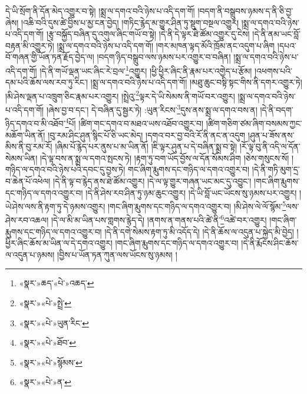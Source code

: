 དེ་ཡི་སྲོག་ནི་དོན་མེད་འགྱུར་བ་སྟེ། །སྨྲ་ལ་དགའ་བའི་ཉེས་པ་འདི་དག་གོ། །བདག་ནི་བསྒྲུབས་ཉམས་ད་ནི་ཅི་བྱ་ཞེས། །འཆི་བའི་དུས་ཚེ་བྱིས་པ་མྱ་ངན་བྱེད། །གཏིང་རྙེད་མ་གྱུར་ཤིན་ཏུ་སྡུག་བསྔལ་འགྱུར། །སྨྲ་ལ་དགའ་བའི་ཉེས་པ་འདི་དག་གོ། །རྩྭ་བསྐྱོད་བཞིན་དུ་འགུལ་ཞིང་གཡོ་བ་སྟེ། །དེ་ནི་དེ་ལྟར་ཐེ་ཚོམ་འགྱུར་དུ་ངེས། །དེ་ནི་ནམ་ཡང་བློ་བརྟན་མི་འགྱུར་ཏེ། །སྨྲ་ལ་དགའ་བའི་ཉེས་པ་འདི་དག་གོ། །གར་མཁན་ལྟད་མོའི་ཁྲོམ་ནང་འདུག་པ་ཞིག །དཔའ་བོ་གཞན་གྱི་ཡོན་ཏན་རྗོད་བྱེད་ལ། །བདག་ཉིད་བསྒྲུབ་ལས་ཉམས་པར་འགྱུར་བ་བཞིན། །སྨྲ་ལ་དགའ་བའི་ཉེས་པ་འདི་དག་གོ། །དེ་ནི་གཡོ་ལྡན་ཡང་ཞིང་རེ་བྲལ་\footnote{«སྣར་»ཆད་«པེ་»འཆད་}འགྱུར། །ཕྱི་ཕྱིར་ཞིང་ནི་རྣམ་པར་འགྱེད་པ་རྩོམ། །འཕགས་པའི་དམ་པའི་ཆོས་ལས་རབ་ཏུ་རིང་། །སྨྲ་ལ་དགའ་བའི་ཉེས་པ་འདི་དག་གོ། །མཐུ་ཆུང་བསྟི་སྟང་གིས་ནི་དགར་འགྱུར་ཏེ། །མི་ཤེས་ལྡན་པ་འཁྲུག་ཅིང་རྣམ་པར་འགྱུར། །སྤྲེའུ་\footnote{«སྣར་»«པེ་»སྤྲེ་}ལྟར་དེ་ཡི་སེམས་ནི་གཡོ་བར་འགྱུར། །སྨྲ་ལ་དགའ་བའི་ཉེས་པ་འདི་དག་གོ། །ཞེས་བྱ་བ་དང་། དེ་བཞིན་དུ་སྦྱར་ཏེ། :ཡུན་རིངས་\footnote{«སྣར་»«པེ་»ཡུན་རིང་}དུས་ནས་སྨྲ་ལ་དགའ་བས་ན། །དེ་ནི་བདག་ཉིད་དགའ་བ་མི་འཐོབ་\footnote{«སྣར་»«པེ་»ཐོབ་}པོ། །ཚིག་གང་དགའ་བ་མཐའ་ཡས་འཐོབ་འགྱུར་བ། །ཚིག་གཅིག་ཙམ་ཞིག་བསམས་ཀྱང་མཆོག་ཡིན་ནོ། །བུ་རམ་ཤིང་ཤུན་སྙིང་པོ་ཅི་ཡང་མེད། །དགའ་བར་བྱ་བའི་རོ་ནི་ནང་ན་འདུག །ཤུན་པ་ཟོས་ནས་མིས་ནི་བུ་རམ་རོ། །ཞིམ་པོ་རྙེད་པར་ནུས་པ་མ་ཡིན་ནོ། །ཇི་ལྟར་ཤུན་པ་དེ་བཞིན་སྨྲ་བ་སྟེ། །རོ་ལྟ་བུ་ནི་འདི་ལ་དོན་སེམས་ཡིན། །དེ་ལྟ་བས་ན་སྨྲ་ལ་དགའ་སྤངས་ཏེ། །རྟག་ཏུ་བག་ཡོད་བྱོས་ལ་དོན་སོམས་ཤིག །ཅེས་གསུངས་སོ། །གཉིད་ལ་དགའ་བའི་ཉེས་པའི་དབང་དུ་བྱས་ཏེ། གང་ཞིག་རྨུགས་དང་གཉིད་ལ་དགའ་འགྱུར་བ། །དེ་ནི་གཏི་མུག་དྲ་བ་ཆེན་པོ་འཕེལ། །དེ་ནི་ལྟ་བ་རྙེད་ནས་ཐེ་ཚོམ་འགྱུར། །དེ་ལ་ལྟ་གྱུར་གཞན་ཡང་མང་དུ་འབྱུང་། །གང་ཞིག་རྨུགས་དང་གཉིད་ལ་དགའ་འགྱུར་བ། །དེ་ནི་ཤེས་རབ་ཤིན་ཏུ་ཉམ་ཆུང་འགྱུར། །དེ་ཡི་བློ་ཡང་ཡོངས་སུ་ཉམས་པར་འགྱུར། །ཡེ་ཤེས་ལས་ནི་རྟག་ཏུ་དེ་ཉམས་འགྱུར། །གང་ཞིག་རྨུགས་དང་གཉིད་ལ་དགའ་འགྱུར་བ། །མི་ཤེས་ལེ་ལོ་སྙོམ་\footnote{«སྣར་»«པེ་»སྙོམས་}ལས་ཤེས་རབ་འཆལ། །དེ་ལ་མི་མ་ཡིན་པས་གླགས་རྙེད་དེ། །ནགས་ན་གནས་པའི་ཚེ་ནི་\footnote{«སྣར་»«པེ་»ན་}འཚེ་བར་འགྱུར། །གང་ཞིག་རྨུགས་དང་གཉིད་ལ་དགའ་འགྱུར་བ། །དེ་ནི་དགེ་སེམས་རྟག་ཏུ་མི་འདོད་དེ། །དེ་ནི་ཆོས་ལ་འདུན་པ་སྐྱེད་མི་བྱེད། །ཕྱིར་ཞིང་ཆོས་མ་ཡིན་ལ་དེ་དགའ་འགྱུར། །གང་ཞིག་རྨུགས་དང་གཉིད་ལ་དགའ་འགྱུར་བ། །དེ་ནི་རྨོངས་ཤིང་ཆོས་ལ་འདུན་པ་ཉམས། །བྱིས་པ་ཡོན་ཏན་ཀུན་ལས་ཡོངས་སུ་ཉམས། །
